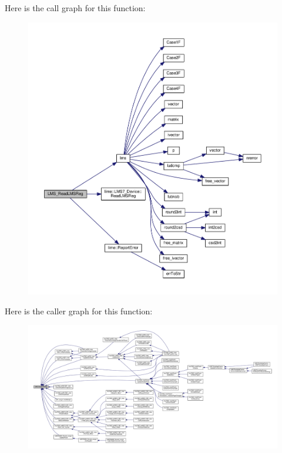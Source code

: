 Here is the call graph for this function\+:
\nopagebreak
\begin{figure}[H]
\begin{center}
\leavevmode
\includegraphics[width=350pt]{df/de1/lms7__api_8cpp_ae9cff988809ec272435f4d18a7682493_cgraph}
\end{center}
\end{figure}




Here is the caller graph for this function\+:
\nopagebreak
\begin{figure}[H]
\begin{center}
\leavevmode
\includegraphics[width=350pt]{df/de1/lms7__api_8cpp_ae9cff988809ec272435f4d18a7682493_icgraph}
\end{center}
\end{figure}


